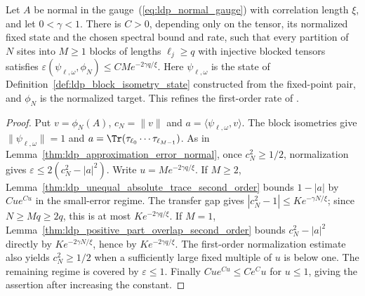 

\begin{lemma}
    \label{thm:ldp_block_approximation_error}
    \leanok
    Let $A$ be normal in the gauge~(\ref{eq:ldp_normal_gauge}) with correlation
    length $\xi$, and let $0<\gamma<1$. There is $C>0$, depending only on
    the tensor, its normalized fixed state and the chosen spectral bound
    and rate, such that every partition of $N$ sites into $M\ge1$ blocks
    of lengths $\ell_j\ge q$ with injective blocked tensors satisfies
    $\varepsilon(\psi_{\ell,\omega},\phi_N)\le CM e^{-2\gamma q/\xi}$.
    Here $\psi_{\ell,\omega}$ is the state of
    Definition~\ref{def:ldp_block_isometry_state} constructed from the
    fixed-point pair, and $\phi_N$ is the normalized target.
    This refines the first-order rate of
    \cite[Lemma~1$'$(i), eq.~(S11)]{Malz2024Preparation}.
\end{lemma}
\begin{proof}\leanok
    Put $v=\phi_N(A)$, $c_N=\lVert v\rVert$ and
    $a=\langle\psi_{\ell,\omega},v\rangle$.
    The block isometries give $\lVert\psi_{\ell,\omega}\rVert=1$ and
    $a=\Tr(\tau_{\ell_0}\cdots\tau_{\ell_{M-1}})$.
    As in Lemma~\ref{thm:ldp_approximation_error_normal}, once
    $c_N^2\ge1/2$, normalization gives
    $\varepsilon\le2(c_N^2-|a|^2)$.
    Write $u=Me^{-2\gamma q/\xi}$.
    If $M\ge2$, Lemma~\ref{thm:ldp_unequal_absolute_trace_second_order}
    bounds $1-|a|$ by $Cu e^{Cu}$ in the small-error regime. The transfer
    gap gives $|c_N^2-1|\le K e^{-\gamma N/\xi}$; since
    $N\ge Mq\ge2q$, this is at most $K e^{-2\gamma q/\xi}$.
    If $M=1$, Lemma~\ref{thm:ldp_positive_part_overlap_second_order}
    bounds $c_N^2-|a|^2$ directly by $K e^{-2\gamma N/\xi}$, hence by
    $K e^{-2\gamma q/\xi}$.
    The first-order normalization estimate also yields $c_N^2\ge1/2$
    when a sufficiently large fixed multiple of $u$ is below one.
    The remaining regime is covered by $\varepsilon\le1$.
    Finally $Cu e^{Cu}\le Ce^C u$ for $u\le1$, giving the assertion
    after increasing the constant.
\end{proof}

